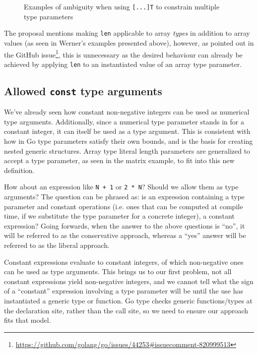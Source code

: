 \begin{figure}
    \caption{Examples of ambiguity when using \texttt{[...]T} to constrain
        multiple type parameters}
    \label{fig:werner-ambiguity}
\end{figure}

The proposal mentions making \texttt{len} applicable to array \emph{types} in
addition to array values (as seen in Werner's examples presented above),
however, as pointed out in the GitHub
issue\footnote{\url{https://github.com/golang/go/issues/44253\#issuecomment-820999513}},
this is unnecessary as the desired behaviour can already be achieved by applying
\texttt{len} to an instantiated value of an array type parameter.

\subsection{Allowed \texttt{const} type arguments}
\label{sec:allowed-const-type-arguments}

We've already seen how constant non-negative integers can be used as numerical
type arguments. Additionally, since a numerical type parameter stands in for a
constant integer, it can itself be used as a type argument. This is consistent
with how in Go type parameters satisfy their own bounds, and is the basis for
creating nested generic structures. Array type literal length parameters are
generalized to accept a  type parameter, as seen in the matrix
example, to fit into this new definition.

How about an expression like \texttt{N + 1} or \texttt{2 * N}? Should we allow
them as  type arguments? The question can be phrased as: is an
expression containing a  type parameter and constant operations (i.e.
ones that can be computed at compile time, if we substitute the type parameter
for a concrete integer), a constant expression? Going forwards, when the answer
to the above questions is ``no'', it will be referred to as the conservative
approach, whereas a ``yes'' answer will be referred to as the liberal approach.

Constant expressions evaluate to constant integers, of which non-negative ones
can be used as  type arguments. This brings us to our first problem,
not all constant expressions yield non-negative integers, and we cannot tell
what the sign of a ``constant'' expression involving a type parameter will be
until the use has instantiated a generic type or function. Go type checks
generic functions/types at the declaration site, rather than the call site, so
we need to ensure our approach fits that model.

